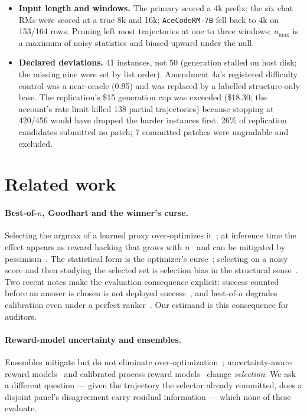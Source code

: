 \documentclass[11pt]{article}
\begin{document}
\begin{itemize}[leftmargin=1.2em,itemsep=1pt]
\item \textbf{Input length and windows.} The primary scored a 4k prefix; the six chat RMs were scored at a true 8k and 16k; \texttt{AceCodeRM-7B} fell back to 4k on 153/164 rows. Pruning left most trajectories at one to three windows; $u_{\max}$ is a maximum of noisy statistics and biased upward under the null.
\item \textbf{Declared deviations.} 41 instances, not 50 (generation stalled on host disk; the missing nine were set by list order). Amendment 4a's registered difficulty control was a near-oracle (0.95) and was replaced by a labelled structure-only base. The replication's \$15 generation cap was exceeded (\$18.30; the account's rate limit killed 138 partial trajectories) because stopping at 420/456 would have dropped the harder instances first. 26\% of replication candidates submitted no patch; 7 committed patches were ungradable and excluded.
\end{itemize}

\FloatBarrier
\section{Related work}
\paragraph{Best-of-$n$, Goodhart and the winner's curse.} Selecting the argmax of a learned proxy over-optimizes it~\citep{gao2023scaling,beirami2024theoretical}; at inference time the effect appears as reward hacking that grows with $n$~\citep{khalaf2025inference,stroebl2024inference,brown2024monkeys} and can be mitigated by pessimism~\citep{yu2026caution}. The statistical form is the optimizer's curse~\citep{smith2006optimizer}; selecting on a noisy score and then studying the selected set is selection bias in the structural sense~\citep{hernan2004structural}. Two recent notes make the evaluation consequence explicit: success counted before an answer is chosen is not deployed success~\citep{emadi2026scaling}, and best-of-$n$ degrades calibration even under a perfect ranker~\citep{trilemma2026}. Our estimand is this consequence for auditors.

\paragraph{Reward-model uncertainty and ensembles.} Ensembles mitigate but do not eliminate over-optimization~\citep{eisenstein2023helping,coste2023reward}; uncertainty-aware reward models~\citep{lou2024urm} and calibrated process reward models~\citep{park2025calibration} change \emph{selection}. We ask a different question --- given the trajectory the selector already committed, does a disjoint panel's disagreement carry residual information --- which none of these evaluate.
\end{document}

